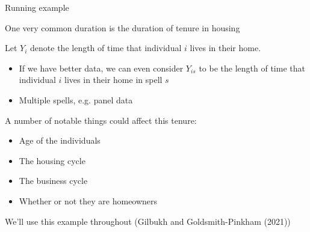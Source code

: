 \documentclass[notes,11pt, aspectratio=169]{beamer}
\newenvironment{wideitemize}{\itemize\addtolength{\itemsep}{10pt}}{\enditemize}
\begin{document}
\begin{frame}{Running example}
  \begin{wideitemize}
  \item One very common duration is the duration of tenure in housing
  \item Let $Y_{i}$ denote the length of time that individual $i$ lives in their home.
    \begin{itemize}
    \item If we have better data, we can even consider $Y_{is}$ to be the length of time that individual $i$ lives in their home in spell $s$
    \item Multiple spells, e.g. panel data
    \end{itemize}
  \item A number of notable things could affect this tenure:
    \begin{itemize}
    \item Age of the individuals
    \item The housing cycle
    \item The business cycle
    \item Whether or not they are homeowners
    \end{itemize}
  \item We'll use this example throughout (Gilbukh and
    Goldsmith-Pinkham (2021))
  \end{wideitemize}
\end{frame}
\end{document}
